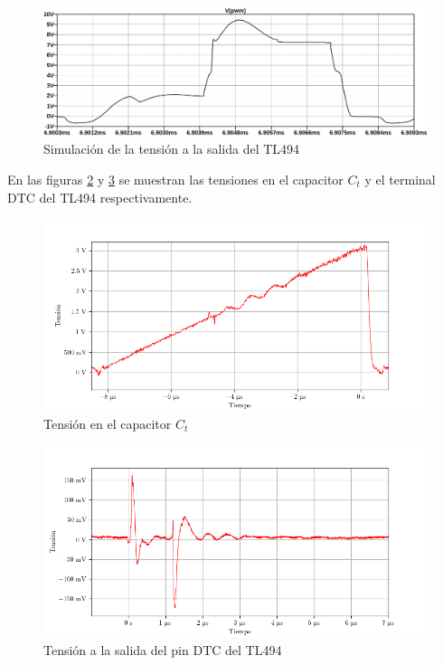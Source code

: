\begin{figure}[H]
    \centering
    \includegraphics[width=\textwidth]{images/sim/3.pdf}
    \caption{Simulación de la tensión a la salida del TL494}
    \label{fig:sim:osc_pwm_vout}
\end{figure}

En las figuras \ref{fig:ct_v} y \ref{fig:dtc_v} se muestran las tensiones en el capacitor $C_t$ y el terminal DTC del TL494 respectivamente.

\begin{figure}[H]
    \centering
    \includegraphics[width=\textwidth]{images/capturas-osciloscopio/17-11-2022/5.png}
    \caption{Tensión en el capacitor $C_t$} %
    \label{fig:ct_v}
\end{figure}


\begin{figure}[H]
    \centering
    \includegraphics[width=\textwidth]{images/capturas-osciloscopio/TL494/DTC_v.png}
    \caption{Tensión a la salida del pin DTC del TL494} %
    \label{fig:dtc_v}
\end{figure}

